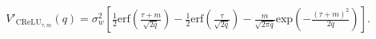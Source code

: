 \documentclass{article}
\theoremstyle{plain}
\theoremstyle{definition}
\theoremstyle{remark}
\begin{document}
\begin{multline}
    V'_{\text{CReLU}_{\tau, m}}(q) = \sigma_w^2 \left[   \frac{1}{2} \text{erf}\left( \frac{\tau +m}{\sqrt{2q}} \right) - \frac{1}{2} \text{erf}\left( \frac{\tau }{\sqrt{2q}} \right)
    - \frac{m}{\sqrt{2 \pi q}} \text{exp}\left( -\frac{ (\tau +m)^2}{{2q}} \right)  \right]. \label{eq:vprime_crelu}
\end{multline}


\end{document}

